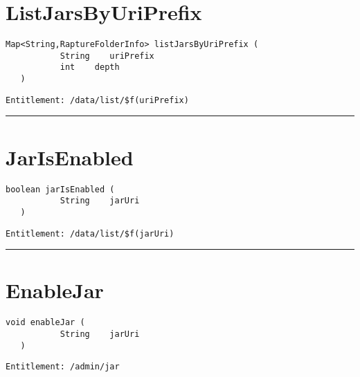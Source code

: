\section{ListJarsByUriPrefix}
\label{Api:ListJarsByUriPrefix}
\begin{lstlisting}[style=nonumbers]
   Map<String,RaptureFolderInfo> listJarsByUriPrefix (
           String    uriPrefix
           int    depth
   )
\end{lstlisting}
\begin{Verbatim}[formatcom=\color{Maroon}]
  Entitlement: /data/list/$f(uriPrefix)
\end{Verbatim}



\rule{12cm}{2pt}
\section{JarIsEnabled}
\label{Api:JarIsEnabled}
\begin{lstlisting}[style=nonumbers]
   boolean jarIsEnabled (
           String    jarUri
   )
\end{lstlisting}
\begin{Verbatim}[formatcom=\color{Maroon}]
  Entitlement: /data/list/$f(jarUri)
\end{Verbatim}



\rule{12cm}{2pt}
\section{EnableJar}
\label{Api:EnableJar}
\begin{lstlisting}[style=nonumbers]
   void enableJar (
           String    jarUri
   )
\end{lstlisting}
\begin{Verbatim}[formatcom=\color{Maroon}]
  Entitlement: /admin/jar
\end{Verbatim}



